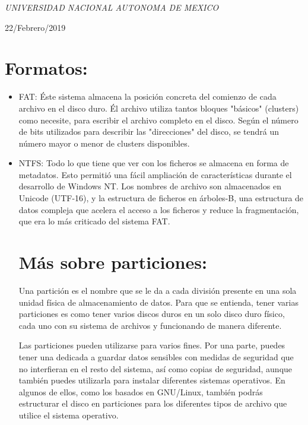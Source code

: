 \documentclass[a4paper, 11pt, oneside]{article}
\begin{document}
\begin{titlepage}
	\textit{UNIVERSIDAD NACIONAL AUTONOMA DE MEXICO} 
	
	\vfill
	
	
	
	
	\vspace{0.3\baselineskip} 
	
	22/Febrero/2019 
	
	 

\end{titlepage}

\section*{Formatos:}
\begin{itemize}
    \item FAT: Éste sistema almacena la posición concreta del comienzo de cada archivo en el disco duro. Él archivo utiliza tantos bloques "básicos" (clusters) como necesite, para escribir el archivo completo en el disco.
    Según el número de bits utilizados para describir las "direcciones" del disco, se tendrá un número mayor o menor de clusters disponibles.
    
    \item NTFS: Todo lo que tiene que ver con los ficheros se almacena en forma de metadatos. Esto permitió una fácil ampliación de características durante el desarrollo de Windows NT.
    Los nombres de archivo son almacenados en Unicode (UTF-16), y la estructura de ficheros en árboles-B, una estructura de datos compleja que acelera el acceso a los ficheros y reduce la fragmentación, que era lo más criticado del sistema FAT.
    
\section*{Más sobre particiones:}
Una partición es el nombre que se le da a cada división presente en una sola unidad física de almacenamiento de datos. Para que se entienda, tener varias particiones es como tener varios discos duros en un solo disco duro físico, cada uno con su sistema de archivos y funcionando de manera diferente.

Las particiones pueden utilizarse para varios fines. Por una parte, puedes tener una dedicada a guardar datos sensibles con medidas de seguridad que no interfieran en el resto del sistema, así como copias de seguridad, aunque también puedes utilizarla para instalar diferentes sistemas operativos. En algunos de ellos, como los basados en GNU/Linux, también podrás estructurar el disco en particiones para los diferentes tipos de archivo que utilice el sistema operativo.


\end{itemize}
\end{document}
